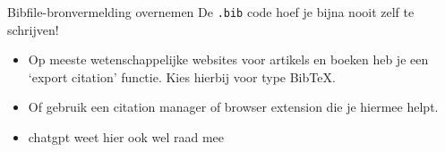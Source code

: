 \begin{frame}{Bibfile-bronvermelding overnemen}
    \centering
    De \texttt{.bib} code hoef je bijna nooit zelf te schrijven!

    \bigskip
    \raggedright
    \begin{itemize}[label=\textbullet]
        \item Op meeste wetenschappelijke websites voor artikels en boeken heb je
    een `export citation' functie. Kies hierbij voor type BibTeX.

        \item Of gebruik een citation manager of browser extension die je hiermee
    helpt. 
    \item chatgpt weet hier ook wel raad mee
    \end{itemize}
    
\end{frame}